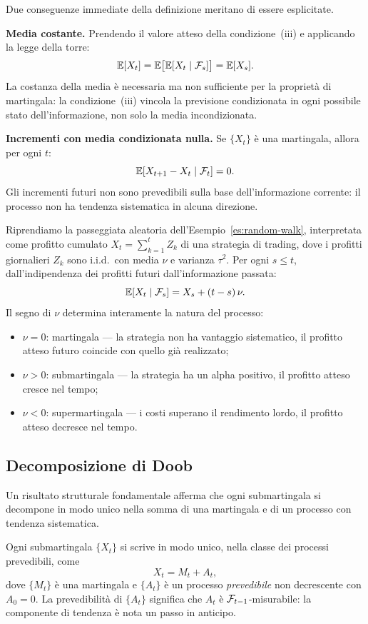 Due conseguenze immediate della definizione meritano di essere
esplicitate.

\noindent\textbf{Media costante.} Prendendo il valore atteso
della condizione~(iii) e applicando la legge della torre:
\[
\mathbb{E}[X_t]=\mathbb{E}\bigl[\mathbb{E}[X_t\mid\mathcal{F}_s]\bigr]=\mathbb{E}[X_s].
\]
La costanza della media \`{e} necessaria ma non sufficiente
per la propriet\`{a} di martingala: la condizione~(iii) vincola
la previsione condizionata in ogni possibile stato
dell'informazione, non solo la media incondizionata.

\noindent\textbf{Incrementi con media condizionata nulla.}
Se $\{X_t\}$ \`{e} una martingala, allora per ogni $t$:
\[
\mathbb{E}[X_{t+1}-X_t\mid\mathcal{F}_t]=0.
\]
Gli incrementi futuri non sono prevedibili sulla base
dell'informazione corrente: il processo non ha tendenza
sistematica in alcuna direzione.

\begin{example}
\label{es:pl-martingala}
Riprendiamo la passeggiata aleatoria
dell'Esempio~\ref{es:random-walk}, interpretata come profitto
cumulato $X_t=\sum_{k=1}^{t}Z_k$ di una strategia di trading,
dove i profitti giornalieri $Z_k$ sono i.i.d.\ con media
$\nu$ e varianza $\tau^2$. Per ogni $s\leq t$,
dall'indipendenza dei profitti futuri dall'informazione passata:
\[
\mathbb{E}[X_t\mid\mathcal{F}_s]=X_s+(t-s)\,\nu.
\]
Il segno di $\nu$ determina interamente la natura del processo:
\begin{itemize}
\item $\nu=0$: martingala --- la strategia non ha vantaggio
sistematico, il profitto atteso futuro coincide con quello
gi\`{a} realizzato;
\item $\nu>0$: submartingala --- la strategia ha un alpha
positivo, il profitto atteso cresce nel tempo;
\item $\nu<0$: supermartingala --- i costi superano il
rendimento lordo, il profitto atteso decresce nel tempo.
\end{itemize}
\end{example}

\subsection{Decomposizione di Doob}

Un risultato strutturale fondamentale afferma che ogni
submartingala si decompone in modo unico nella somma di una
martingala e di un processo con tendenza sistematica.

\begin{theorem}
\label{thm:doob-meyer}
Ogni submartingala $\{X_t\}$ si scrive in modo unico, nella
classe dei processi prevedibili, come
\[
X_t = M_t + A_t,
\]
dove $\{M_t\}$ \`{e} una martingala e $\{A_t\}$ \`{e} un
processo \emph{prevedibile} non decrescente con $A_0=0$.
La prevedibilit\`{a} di $\{A_t\}$ significa che $A_t$ \`{e}
$\mathcal{F}_{t-1}$-misurabile: la componente di tendenza \`{e} nota
un passo in anticipo.
\end{theorem}

